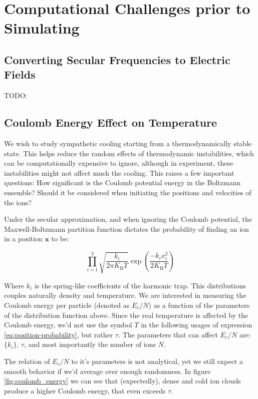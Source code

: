 \chapter{Computational Challenges prior to Simulating}

\section{Converting Secular Frequencies to Electric Fields}\label{sec:comp/freqs2aq}

TODO: \cite{AkermanThesis}

\section{Coulomb Energy Effect on Temperature}\label{sec:comp/coulomb}

We wish to study sympathetic cooling starting from a thermodynamically stable state. This helps reduce the random effects of thermodynamic instabilities, which can be computationally expensive to ignore, although in experiment, these instabilities might not affect much the cooling. This raises a few important questions: How significant is the Coulomb potential energy in the Boltzmann ensemble? Should it be considered when initiating the positions and velocities of the ions?

Under the secular approximation, and when ignoring the Coulomb potential, the Maxwell-Boltzmann partition function dictates the probability of finding an ion in a position $\mathbf{x}$ to be:

\begin{equation}
	\prod_{i=1}^3 \sqrt{\frac{k_i}{2\pi K_\text{B} T}} \exp\left(\frac{-k_i x_i^2}{2 K_\text{B} T}\right)
	\label{eq:position-probability}
\end{equation}

Where $k_i$ is the spring-like coefficients of the harmonic trap. This distributions couples naturally density and temperature. We are interested in measuring the Coulomb energy per particle (denoted as $E_c/N$) as a function of the parameters of the distribution function above. Since the real temperature is affected by the Coulomb energy, we'd not use the symbol $T$ in the following usages of expression \ref{eq:position-probability}, but rather $\tau$. The parameters that can affect $E_c/N$ are: $\{k_i\}$, $\tau$, and most importantly the number of ions $N$.

The relation of $E_c/N$ to it's parameters is not analytical, yet we still expect a smooth behavior if we'd average over enough randomness. In figure \ref{fig:coulomb_energy} we can see that (expectedly), dense and cold ion clouds produce a higher Coulomb energy, that even exceeds $\tau$.


